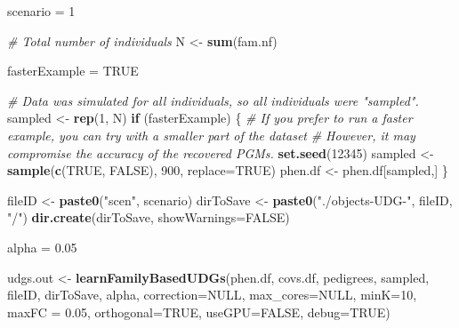 \documentclass[]{article}
\newenvironment{Shaded}{\begin{snugshade}}{\end{snugshade}}
\newcommand{\KeywordTok}[1]{\textcolor[rgb]{0.13,0.29,0.53}{\textbf{#1}}}
\newcommand{\DataTypeTok}[1]{\textcolor[rgb]{0.13,0.29,0.53}{#1}}
\newcommand{\DecValTok}[1]{\textcolor[rgb]{0.00,0.00,0.81}{#1}}
\newcommand{\FloatTok}[1]{\textcolor[rgb]{0.00,0.00,0.81}{#1}}
\newcommand{\StringTok}[1]{\textcolor[rgb]{0.31,0.60,0.02}{#1}}
\newcommand{\CommentTok}[1]{\textcolor[rgb]{0.56,0.35,0.01}{\textit{#1}}}
\newcommand{\OtherTok}[1]{\textcolor[rgb]{0.56,0.35,0.01}{#1}}
\newcommand{\ControlFlowTok}[1]{\textcolor[rgb]{0.13,0.29,0.53}{\textbf{#1}}}
\newcommand{\NormalTok}[1]{#1}
\begin{document}
\begin{Shaded}
\begin{Highlighting}[]

\NormalTok{scenario =}\StringTok{ }\DecValTok{1}

\CommentTok{# Total number of individuals}
\NormalTok{N <-}\StringTok{ }\KeywordTok{sum}\NormalTok{(fam.nf) }

\NormalTok{fasterExample =}\StringTok{ }\OtherTok{TRUE}

\CommentTok{# Data was simulated for all individuals, so all individuals were "sampled".}
\NormalTok{sampled <-}\StringTok{ }\KeywordTok{rep}\NormalTok{(}\DecValTok{1}\NormalTok{, N) }
\ControlFlowTok{if}\NormalTok{ (fasterExample) \{}
  \CommentTok{# If you prefer to run a faster example, you can try with a smaller part of the dataset}
  \CommentTok{# However, it may compromise the accuracy of the recovered PGMs.}
  \KeywordTok{set.seed}\NormalTok{(}\DecValTok{12345}\NormalTok{)}
\NormalTok{  sampled <-}\StringTok{ }\KeywordTok{sample}\NormalTok{(}\KeywordTok{c}\NormalTok{(}\OtherTok{TRUE}\NormalTok{, }\OtherTok{FALSE}\NormalTok{), }\DecValTok{900}\NormalTok{, }\DataTypeTok{replace=}\OtherTok{TRUE}\NormalTok{)}
\NormalTok{  phen.df <-}\StringTok{ }\NormalTok{phen.df[sampled,]}
\NormalTok{\}}

\NormalTok{fileID <-}\StringTok{ }\KeywordTok{paste0}\NormalTok{(}\StringTok{"scen"}\NormalTok{, scenario)}
\NormalTok{dirToSave <-}\StringTok{ }\KeywordTok{paste0}\NormalTok{(}\StringTok{"./objects-UDG-"}\NormalTok{, fileID, }\StringTok{"/"}\NormalTok{)}
\KeywordTok{dir.create}\NormalTok{(dirToSave, }\DataTypeTok{showWarnings=}\OtherTok{FALSE}\NormalTok{)}

\NormalTok{alpha =}\StringTok{ }\FloatTok{0.05}

\NormalTok{udgs.out <-}\StringTok{ }\KeywordTok{learnFamilyBasedUDGs}\NormalTok{(phen.df, covs.df, pedigrees, sampled, }
\NormalTok{                                 fileID, dirToSave, alpha, }\DataTypeTok{correction=}\OtherTok{NULL}\NormalTok{, }
                                 \DataTypeTok{max_cores=}\OtherTok{NULL}\NormalTok{, }\DataTypeTok{minK=}\DecValTok{10}\NormalTok{, }\DataTypeTok{maxFC =} \FloatTok{0.05}\NormalTok{,}
                                 \DataTypeTok{orthogonal=}\OtherTok{TRUE}\NormalTok{, }\DataTypeTok{useGPU=}\OtherTok{FALSE}\NormalTok{, }\DataTypeTok{debug=}\OtherTok{TRUE}\NormalTok{)}
\end{Highlighting}
\end{Shaded}
\end{document}
